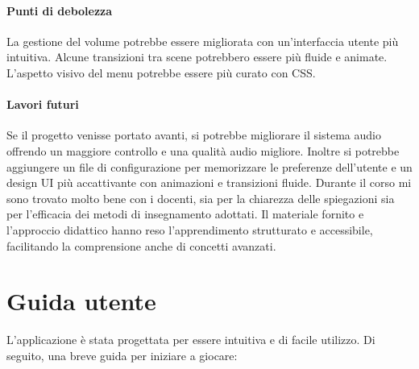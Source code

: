\documentclass[a4paper,12pt]{report}
\begin{document}
\subsubsection{Punti di debolezza}
La gestione del volume potrebbe essere migliorata con un'interfaccia utente più intuitiva.
Alcune transizioni tra scene potrebbero essere più fluide e animate.
L’aspetto visivo del menu potrebbe essere più curato con CSS.
\subsubsection{Lavori futuri}
Se il progetto venisse portato avanti, si potrebbe migliorare il sistema audio offrendo un maggiore controllo e una qualità audio migliore. Inoltre si potrebbe aggiungere un file di configurazione per memorizzare le preferenze dell’utente e un design UI più accattivante con animazioni e transizioni fluide.
Durante il corso mi sono trovato molto bene con i docenti, sia per la chiarezza delle spiegazioni sia per l’efficacia dei metodi di insegnamento adottati. Il materiale fornito e l’approccio didattico hanno reso l’apprendimento strutturato e accessibile, facilitando la comprensione anche di concetti avanzati.

\appendix
\chapter{Guida utente}

L'applicazione è stata progettata per essere intuitiva e di facile utilizzo. Di seguito, una breve guida per iniziare a giocare:
\end{document}
